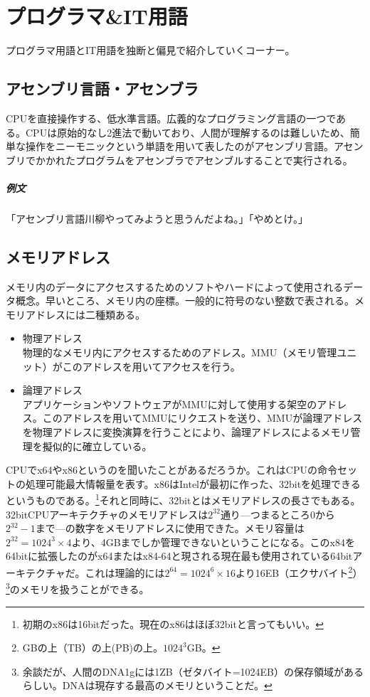 \documentclass[dvipdfmx,jb5]{jreport}
\begin{document}
\newpage
\section{プログラマ\&IT用語}
プログラマ用語とIT用語を独断と偏見で紹介していくコーナー。

\subsection{アセンブリ言語・アセンブラ}
CPUを直接操作する、低水準言語。広義的なプログラミング言語の一つである。CPUは原始的なし2進法で動いており、人間が理解するのは難しいため、簡単な操作をニーモニックという単語を用いて表したのがアセンブリ言語。アセンブリでかかれたプログラムをアセンブラでアセンブルすることで実行される。

\subparagraph{例文} 「アセンブリ言語川柳やってみようと思うんだよね。」「やめとけ。」

\subsection{メモリアドレス}
メモリ内のデータにアクセスするためのソフトやハードによって使用されるデータ概念。早いところ、メモリ内の座標。一般的に符号のない整数で表される。メモリアドレスには二種類ある。

\begin{itemize}
      \item 物理アドレス\\
            物理的なメモリ内にアクセスするためのアドレス。MMU（メモリ管理ユニット）がこのアドレスを用いてアクセスを行う。

      \item 論理アドレス\\
            アプリケーションやソフトウェアがMMUに対して使用する架空のアドレス。このアドレスを用いてMMUにリクエストを送り、MMUが論理アドレスを物理アドレスに変換演算を行うことにより、論理アドレスによるメモリ管理を擬似的に確立している。
\end{itemize}

CPUでx64やx86というのを聞いたことがあるだろうか。これはCPUの命令セットの処理可能最大情報量を表す。x86はIntelが最初に作った、32bitを処理できるというものである。\footnote{初期のx86は16bitだった。現在のx86はほぼ32bitと言ってもいい。}それと同時に、32bitとはメモリアドレスの長さでもある。32bitCPUアーキテクチャのメモリアドレスは$2^{32}$通り---つまるところ$0$から$2^{32}-1$まで---の数字をメモリアドレスに使用できた。メモリ容量は$2^{32} = 1024^3\times4$より、4GBまでしか管理できないということになる。このx84を64bitに拡張したのがx64またはx84-64と現される現在最も使用されている64bitアーキテクチャだ。これは理論的には$2^{64} = 1024^6\times16$より16EB（エクサバイト\footnote{GBの上（TB）の上(PB)の上。$1024^3$GB。}）\footnote{余談だが、人間のDNA1gには1ZB（ゼタバイト=1024EB）の保存領域があるらしい。DNAは現存する最高のメモリということだ。}のメモリを扱うことができる。
\end{document}
